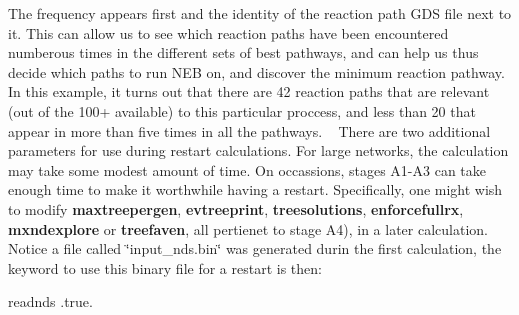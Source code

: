 The frequency appears first and the identity of the reaction path G\+DS file next to it. This can allow us to see which reaction paths have been encountered numberous times in the different sets of best pathways, and can help us thus decide which paths to run N\+EB on, and discover the minimum reaction pathway. In this example, it turns out that there are 42 reaction paths that are relevant (out of the 100+ available) to this particular proccess, and less than 20 that appear in more than five times in all the pathways. ~\newline
 There are two additional parameters for use during restart calculations. For large networks, the calculation may take some modest amount of time. On occassions, stages A1-\/\+A3 can take enough time to make it worthwhile having a restart. Specifically, one might wish to modify {\bfseries maxtreepergen}, {\bfseries evtreeprint}, {\bfseries treesolutions}, {\bfseries enforcefullrx}, {\bfseries mxndexplore} or {\bfseries treefaven}, all pertienet to stage A4), in a later calculation. Notice a file called \char`\"{}input\+\_\+nds.\+bin\char`\"{} was generated durin the first calculation, the keyword to use this binary file for a restart is then\+: \begin{DoxyVerb}readnds .true.
\end{DoxyVerb}


